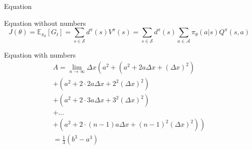 \documentclass{beamer}
\begin{document}
\begin{frame}{Equation}
	\begin{block}{Equation without numbers} 
		\begin{equation*}
			J(\theta) = \mathbb{E}_{\pi_\theta}[G_t] = \sum_{s\in\mathcal{S}} d^\pi (s)V^\pi(s)=\sum_{s\in\mathcal{S}} d^\pi(s)\sum_{a\in\mathcal{A}}\pi_\theta(a|s)Q^\pi(s,a)
		\end{equation*}
	\end{block}
\end{frame}

\begin{frame}
	\begin{block}{Equation with numbers}
		\begin{multline}
			A=\lim_{n\rightarrow\infty}\Delta x\left(a^{2}+\left(a^{2}+2a\Delta x+\left(\Delta x\right)^{2}\right)\right.\label{eq:reset}\\
			+\left(a^{2}+2\cdot2a\Delta x+2^{2}\left(\Delta x\right)^{2}\right)\\
			+\left(a^{2}+2\cdot3a\Delta x+3^{2}\left(\Delta x\right)^{2}\right)\\
			+\ldots\\
			\left.+\left(a^{2}+2\cdot(n-1)a\Delta x+(n-1)^{2}\left(\Delta x\right)^{2}\right)\right)\\
			=\frac{1}{3}\left(b^{3}-a^{3}\right)
		\end{multline}
	\end{block}
\end{frame}
\end{document}
